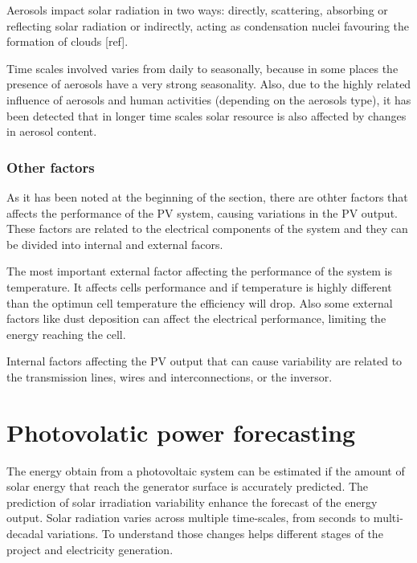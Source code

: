 Aerosols impact solar radiation in two ways: directly, scattering, absorbing or reflecting solar radiation or indirectly, acting as condensation nuclei favouring the formation of clouds [ref].

Time scales involved varies from daily to seasonally, because in some places the presence of aerosols have a very strong seasonality. Also, due to the highly related influence of aerosols and human activities (depending on the aerosols type), it has been detected that in longer time scales solar resource is also affected by changes in aerosol content.


\subsubsection{Other factors}

As it has been noted at the beginning of the section, there are othter factors that affects the performance of the PV system, causing variations in the PV output. These factors are related to the electrical components of the system and they can be divided into internal and external facors.

The most important external factor affecting the performance of the system is temperature. It affects cells performance and if temperature is highly different than the optimun cell temperature the efficiency will drop. Also some external factors like dust deposition can affect the electrical performance, limiting the energy reaching the cell.

Internal factors affecting the PV output that can cause variability are related to the transmission lines, wires and interconnections, or the inversor.

\section{Photovolatic power forecasting}

The energy obtain from a photovoltaic system can be estimated if the amount of solar energy that reach the generator surface is accurately predicted. The prediction of solar irradiation variability enhance the forecast of the energy output. Solar radiation varies across multiple time-scales, from seconds to multi-decadal variations. To understand those changes helps different stages of the project and electricity generation.

